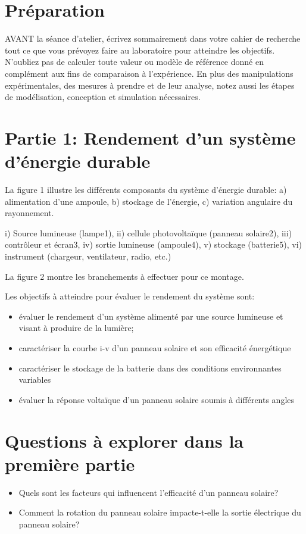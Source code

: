 \documentclass[canadien,12pt,oneside,letterpaper]{article}
\begin{document}
\section{Préparation}\label{sec:preparation}
\vspace{-2ex}
AVANT la séance d’atelier, écrivez sommairement dans votre cahier de recherche
tout ce que vous prévoyez faire au laboratoire pour atteindre les objectifs. N’oubliez
pas de calculer toute valeur ou modèle de référence donné en complément aux fins de
comparaison à l’expérience. En plus des manipulations expérimentales, des mesures
à prendre et de leur analyse, notez aussi les étapes de modélisation, conception et
simulation nécessaires. 


\section{Partie 1: Rendement d'un système d'énergie durable}\label{sec:partie1}
\vspace{-2ex}

La figure 1 illustre les différents composants du système d'énergie durable: a)  alimentation d'une ampoule, b) stockage de l'énergie, c) variation angulaire du rayonnement.

i) Source lumineuse (lampe1), ii) cellule photovoltaïque (panneau solaire2), iii) contrôleur et écran3, iv) sortie lumineuse (ampoule4), v) stockage (batterie5), vi) instrument (chargeur, ventilateur, radio, etc.)

La figure 2 montre les branchements à effectuer pour ce montage.

 
Les objectifs à atteindre pour évaluer le rendement du système sont:
\begin{itemize}
\item évaluer le rendement d'un système alimenté par une source lumineuse et visant à produire de la lumière;
\item caractériser la courbe i-v d'un panneau solaire et son efficacité énergétique
\item caractériser le stockage de la batterie dans des conditions environnantes variables
\item évaluer la réponse voltaïque d'un panneau solaire soumis à différents angles
\end{itemize}


\section{Questions à explorer dans la première partie}
\begin{itemize}
\item Quels sont les facteurs qui influencent l'efficacité d'un panneau solaire? 
\item Comment la rotation du panneau solaire impacte-t-elle la sortie électrique du panneau solaire?
\end{itemize}
\end{document}
